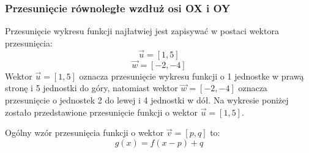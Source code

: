 \documentclass[12pt, a4paper]{article}
\begin{document}
\subsubsection*{Przesunięcie równoległe wzdłuż osi OX i OY}
Przesunięcie wykresu funkcji najłatwiej jest zapisywać w postaci wektora przesunięcia:
$$\overrightarrow{u} = [1,5]$$
$$\overrightarrow{w} = [-2,-4]$$
Wektor $\overrightarrow{u} = [1,5]$ oznacza przesunięcie wykresu funkcji o 1 jednostke w prawą stronę
i 5 jednostki do góry, natomiast wektor $\overrightarrow{w} = [-2,-4]$
oznacza przesunięcie o jednostek 2 do lewej i 4 jednostki w dół. Na wykresie poniżej zostało przedstawione przesunięcie funkcji o
wektor $\overrightarrow{u} = [1,5]$.
\begin{center}
\end{center}
Ogólny wzór przesunięcia funkcji o wektor $\overrightarrow{v} = [p, q]$ to:
$$g(x) = f\left(x - p\right) + q$$
\end{document}
